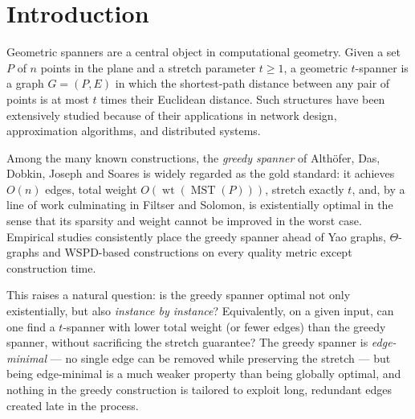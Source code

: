 \documentclass{article}
\DeclareMathOperator{\wt}{wt}
\DeclareMathOperator{\MST}{MST}
\begin{document}
\section{Introduction}
Geometric spanners are a central object in computational geometry. Given
a set $P$ of $n$ points in the plane and a stretch parameter $t\ge 1$, a
geometric $t$-spanner is a graph $G=(P,E)$ in which the shortest-path
distance between any pair of points is at most $t$ times their Euclidean
distance. Such structures have been extensively studied because of their
applications in network design, approximation algorithms, and distributed
systems.

Among the many known constructions, the \emph{greedy spanner} of
Alth\"ofer, Das, Dobkin, Joseph and Soares is widely regarded as the
gold standard: it achieves $O(n)$ edges, total weight
$O(\wt(\MST(P)))$, stretch exactly $t$, and, by a line of work
culminating in Filtser and Solomon, is existentially optimal in the
sense that its sparsity and weight cannot be improved in the worst
case. Empirical studies consistently place the greedy spanner ahead of
Yao graphs, $\Theta$-graphs and WSPD-based constructions on every
quality metric except construction time.

This raises a natural question: is the greedy spanner optimal not only
existentially, but also \emph{instance by instance}? Equivalently, on a
given input, can one find a $t$-spanner with lower total weight (or fewer
edges) than the greedy spanner, without sacrificing the
stretch guarantee? The greedy spanner is \emph{edge-minimal} --- no
single edge can be removed while preserving the stretch --- but being
edge-minimal is a much weaker property than being globally optimal, and
nothing in the greedy construction is tailored to exploit long,
redundant edges created late in the process.
\end{document}
